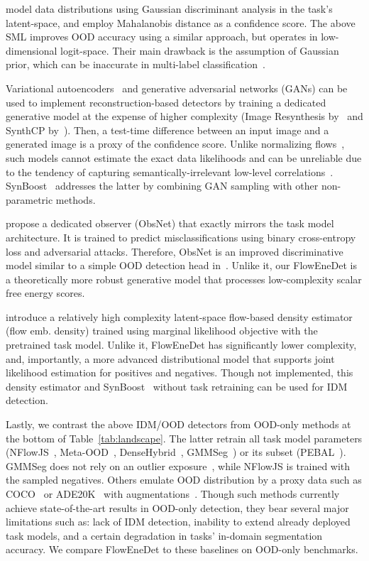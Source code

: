 \documentclass[accepted, startpage]{uai2023}
\begin{document}
\citet{NEURIPS2018_abdeb6f5} model data distributions using Gaussian discriminant analysis in the task's latent-space, and employ Mahalanobis distance as a confidence score. The above SML improves OOD accuracy using a similar approach, but operates in low-dimensional logit-space. Their main drawback is the assumption of Gaussian prior, which can be inaccurate in multi-label classification~\citep{kamoi2020mahalanobis}.

Variational autoencoders~\citep{baur2018deep} and generative adversarial networks (GANs) can be used to implement reconstruction-based detectors by training a dedicated generative model at the expense of higher complexity (Image Resynthesis by~\citet{Lis_2019_ICCV} and SynthCP by~\citet{xia2020synthesize}). Then, a test-time difference between an input image and a generated image is a proxy of the confidence score. Unlike normalizing flows~\citep{rezende15}, such models cannot estimate the exact data likelihoods and can be unreliable due to the tendency of capturing semantically-irrelevant low-level correlations~\citep{nalisnick2018do}. SynBoost~\citep{Di_Biase_2021_CVPR} addresses the latter by combining GAN sampling with other non-parametric methods.

\citet{besnier2021triggering} propose a dedicated observer (ObsNet) that exactly mirrors the task model architecture. It is trained to predict misclassifications using binary cross-entropy loss and adversarial attacks. Therefore, ObsNet is an improved discriminative model similar to a simple OOD detection head in~\citep{bevandic}. Unlike it, our FlowEneDet is a theoretically more robust generative model that processes low-complexity scalar free energy scores.

\citet{fishyscapes} introduce a relatively high complexity latent-space flow-based density estimator (flow emb. density) trained using marginal likelihood objective with the pretrained task model. Unlike it, FlowEneDet has significantly lower complexity, and, importantly, a more advanced distributional model that supports joint likelihood estimation for positives and negatives. Though not implemented, this density estimator and SynBoost~\citep{Di_Biase_2021_CVPR} without task retraining can be used for IDM detection.

Lastly, we contrast the above IDM/OOD detectors from OOD-only methods at the bottom of Table~\ref{tab:landscape}. The latter retrain all task model parameters (NFlowJS~\citep{nflowjs}, Meta-OOD~\citep{Chan_2021_ICCV}, DenseHybrid~\citep{grcic22eccv}, GMMSeg~\citep{liang2022gmmseg}) or its subset (PEBAL~\citep{pebal}). GMMSeg does not rely on an outlier exposure~\citep{wang2023outofdistribution}, while NFlowJS is trained with the sampled negatives. Others emulate OOD distribution by a proxy data such as COCO~\citep{lin2014microsoft} or ADE20K~\citep{Zhou_2017_CVPR} with augmentations~\citep{li2021cutpaste}. Though such methods currently achieve state-of-the-art results in OOD-only detection, they bear several major limitations such as: lack of IDM detection, inability to extend already deployed task models, and a certain degradation in tasks' in-domain segmentation accuracy. We compare FlowEneDet to these baselines on OOD-only benchmarks.
\end{document}

